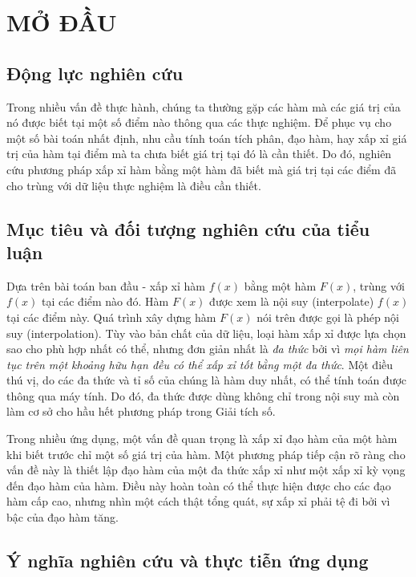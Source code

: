 \chapter{MỞ ĐẦU}

\section{Động lực nghiên cứu}

Trong nhiều vấn đề thực hành, chúng ta thường gặp các hàm mà các giá trị của nó được biết tại một số điểm nào thông qua các thực nghiệm. Để phục vụ cho một số bài toán nhất định, nhu cầu tính toán tích phân, đạo hàm, hay xấp xỉ giá trị của hàm tại điểm mà ta chưa biết giá trị tại đó là cần thiết. Do đó, nghiên cứu phương pháp xấp xỉ hàm bằng một hàm đã biết mà giá trị tại các điểm đã cho trùng với dữ liệu thực nghiệm là điều cần thiết.

\section{Mục tiêu và đối tượng nghiên cứu của tiểu luận}

Dựa trên bài toán ban đầu - xấp xỉ hàm $f(x)$ bằng một hàm $F(x)$, trùng với $f(x)$ tại các điểm nào đó. Hàm $F(x)$ được xem là nội suy (interpolate) $f(x)$ tại các điểm này. Quá trình xây dựng hàm $F(x)$ nói trên được gọi là phép nội suy (interpolation). Tùy vào bản chất của dữ liệu, loại hàm xấp xỉ được lựa chọn sao cho phù hợp nhất có thể, nhưng đơn giản nhất là \emph{đa thức} bởi vì \emph{mọi hàm liên tục trên một khoảng hữu hạn đều có thể xấp xỉ tốt bằng một đa thức}. Một điều thú vị, do các đa thức và tỉ số của chúng là hàm duy nhất, có thể tính toán được thông qua máy tính. Do đó, đa thức được dùng không chỉ trong nội suy mà còn làm cơ sở cho hầu hết phương pháp trong Giải tích số. 

Trong nhiều ứng dụng, một vấn đề quan trọng là xấp xỉ đạo hàm của một hàm khi biết trước chỉ một số giá trị của hàm. Một phương pháp tiếp cận rõ ràng cho vấn đề này là thiết lập đạo hàm của một đa thức xấp xỉ như một xấp xỉ kỳ vọng đến đạo hàm của hàm. Điều này hoàn toàn có thể thực hiện được cho các đạo hàm cấp cao, nhưng nhìn một cách thật tổng quát, sự xấp xỉ phải tệ đi bởi vì bậc của đạo hàm tăng. 

\section{Ý nghĩa nghiên cứu và thực tiễn ứng dụng}

